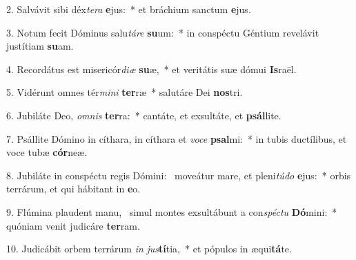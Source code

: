 2. Salvávit sibi déx\textit{te}\textit{ra} \textbf{e}jus:~*  et bráchium sanctum \textbf{e}jus.\

3. Notum fecit Dóminus salu\textit{tá}\textit{re} \textbf{su}um:~*  in conspéctu Géntium revelávit justítiam \textbf{su}am.\

4. Recordátus est misericór\textit{di}\textit{æ} \textbf{su}æ,~*  et veritátis suæ dómui \textbf{Is}raël.\

5. Vidérunt omnes tér\textit{mi}\textit{ni} \textbf{ter}ræ~*  salutáre Dei \textbf{nos}tri.\

6. Jubiláte Deo, \textit{om}\textit{nis} \textbf{ter}ra:~*  cantáte, et exsultáte, et \textbf{psál}lite.\

7. Psállite Dómino in cíthara, in cíthara et \textit{vo}\textit{ce} \textbf{psal}mi:~*  in tubis ductílibus, et voce tubæ \textbf{cór}neæ.\

8. Jubiláte in conspéctu regis Dómini: \dag\  moveátur mare, et pleni\textit{tú}\textit{do} \textbf{e}jus:~*  orbis terrárum, et qui hábitant in \textbf{e}o.\

9. Flúmina plaudent manu, \dag\  simul montes exsultábunt a con\textit{spéc}\textit{tu} \textbf{Dó}mini:~*  quóniam venit judicáre \textbf{ter}ram.\

10. Judicábit orbem terrárum \textit{in} \textit{jus}\textbf{tí}tia,~*  et pópulos in æqui\textbf{tá}te.\

